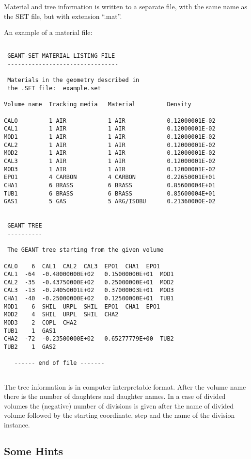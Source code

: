 {Material and tree information is written to a separate file,
with the same name as the SET file, but with extension ``.mat''.
 
An example of a material file:
 
\begin{verbatim}
 
 GEANT-SET MATERIAL LISTING FILE
 --------------------------------
 
 Materials in the geometry described in
 the .SET file:  example.set
 
Volume name  Tracking media   Material         Density
 
CALO         1 AIR            1 AIR            0.12000001E-02
CAL1         1 AIR            1 AIR            0.12000001E-02
MOD1         1 AIR            1 AIR            0.12000001E-02
CAL2         1 AIR            1 AIR            0.12000001E-02
MOD2         1 AIR            1 AIR            0.12000001E-02
CAL3         1 AIR            1 AIR            0.12000001E-02
MOD3         1 AIR            1 AIR            0.12000001E-02
EPO1         4 CARBON         4 CARBON         0.22650001E+01
CHA1         6 BRASS          6 BRASS          0.85600004E+01
TUB1         6 BRASS          6 BRASS          0.85600004E+01
GAS1         5 GAS            5 ARG/ISOBU      0.21360000E-02
 
 
 GEANT TREE
 ----------
 
 The GEANT tree starting from the given volume
 
CALO    6  CAL1  CAL2  CAL3  EPO1  CHA1  EPO1
CAL1  -64  -0.48000000E+02   0.15000000E+01  MOD1
CAL2  -35  -0.43750000E+02   0.25000000E+01  MOD2
CAL3  -13  -0.24050001E+02   0.37000003E+01  MOD3
CHA1  -40  -0.25000000E+02   0.12500000E+01  TUB1
MOD1    6  SHIL  URPL  SHIL  EPO1  CHA1  EPO1
MOD2    4  SHIL  URPL  SHIL  CHA2
MOD3    2  COPL  CHA2
TUB1    1  GAS1
CHA2  -72  -0.23500000E+02   0.65277779E+00  TUB2
TUB2    1  GAS2
 
   ------ end of file -------
 
\end{verbatim}
 
The tree information is in computer interpretable format. After the
volume name there is the number of daughters and daughter names.
In a case of divided volumes the (negative) number of divisions is given after
the name of divided volume followed by the starting coordinate, step
and the name of the division instance.
 
 
 
\subsection*{Some Hints}
 
}
